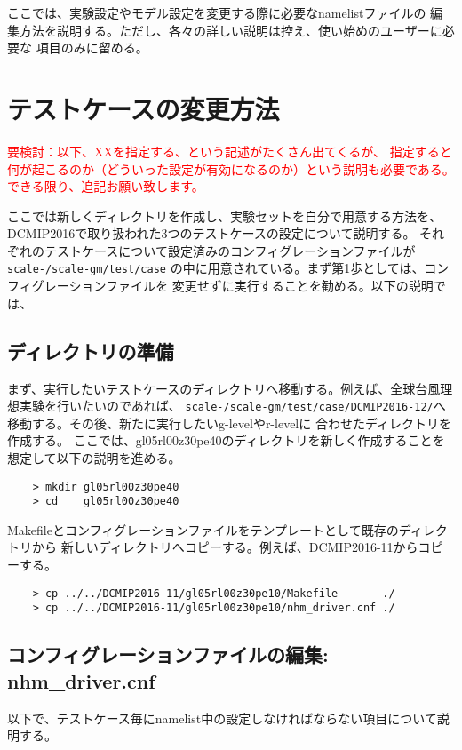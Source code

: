 ここでは、実験設定やモデル設定を変更する際に必要なnamelistファイルの
編集方法を説明する。ただし、各々の詳しい説明は控え、使い始めのユーザーに必要な
項目のみに留める。

\section{テストケースの変更方法}

\textcolor{red}{要検討：以下、XXを指定する、という記述がたくさん出てくるが、
指定すると何が起こるのか（どういった設定が有効になるのか）という説明も必要である。
できる限り、追記お願い致します。}


 \noindent ここでは新しくディレクトリを作成し、実験セットを自分で用意する方法を、
DCMIP2016で取り扱われた3つのテストケースの設定について説明する。
それぞれのテストケースについて設定済みのコンフィグレーションファイルが\texttt{scale-{\version}/scale-gm/test/case}
の中に用意されている。まず第1歩としては、コンフィグレーションファイルを
変更せずに実行することを勧める。以下の説明では、

\subsection{ディレクトリの準備}
まず、実行したいテストケースのディレクトリへ移動する。例えば、全球台風理想実験を行いたいのであれば、
\texttt{scale-{\version}/scale-gm/test/case/DCMIP2016-12/}へ移動する。その後、新たに実行したいg-levelやr-levelに
合わせたディレクトリを作成する。
ここでは、gl05rl00z30pe40のディレクトリを新しく作成することを想定して以下の説明を進める。
 \begin{verbatim}
    > mkdir gl05rl00z30pe40
    > cd    gl05rl00z30pe40
 \end{verbatim}

 \noindent Makefileとコンフィグレーションファイルをテンプレートとして既存のディレクトリから
新しいディレクトリへコピーする。例えば、DCMIP2016-11からコピーする。
 \begin{verbatim}
    > cp ../../DCMIP2016-11/gl05rl00z30pe10/Makefile       ./
    > cp ../../DCMIP2016-11/gl05rl00z30pe10/nhm_driver.cnf ./
 \end{verbatim}

\subsection{コンフィグレーションファイルの編集: nhm\_driver.cnf}
以下で、テストケース毎にnamelist中の設定しなければならない項目について説明する。

